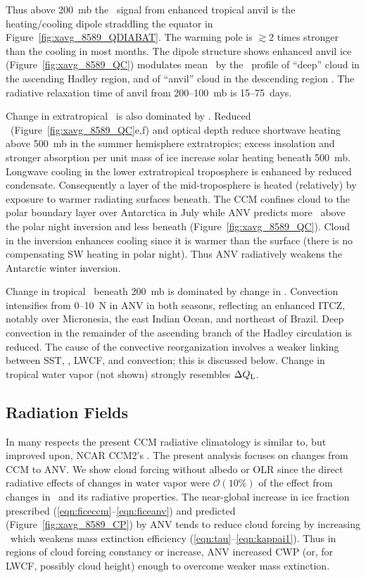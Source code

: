 \documentclass[agums]{aguplus}
\begin{document}
Thus above 200~mb the \QR\ signal from enhanced tropical anvil is the
heating/cooling dipole straddling the equator in
Figure~\ref{fig:xavg_8589_QDIABAT}. 
The warming pole is $\gtrsim 2$ times stronger than the cooling in
most months.
The dipole structure shows enhanced anvil ice
(Figure~\ref{fig:xavg_8589_QC}) modulates mean \QR\ by the \QR\
profile of ``deep'' cloud in the ascending Hadley region, and of
``anvil'' cloud in the descending region \cite[terminology of][their
Figure~16]{RaR891}. 
The radiative relaxation time of anvil from 200--100~mb is
15--75~days.  

Change in extratropical \QT\ is also dominated by \QR.
Reduced \qc\ (Figure~\ref{fig:xavg_8589_QC}e,f) and optical depth
reduce shortwave heating above 500~mb in the summer hemisphere
extratropics; excess insolation and stronger absorption per unit mass
of ice increase solar heating beneath 500~mb. 
Longwave cooling in the lower extratropical troposphere is enhanced by
reduced condensate.
Consequently a layer of the mid-troposphere is heated (relatively) by
exposure to warmer radiating surfaces beneath.
The CCM confines cloud to the polar boundary layer over Antarctica in 
July while ANV predicts more \qc\ above the polar night inversion and
less beneath (Figure~\ref{fig:xavg_8589_QC}). 
Cloud in the inversion enhances cooling since it is warmer than the
surface (there is no compensating SW heating in polar night). 
Thus ANV radiatively weakens the Antarctic winter inversion.

Change in tropical \QT\ beneath 200~mb is dominated by change in \QL.
Convection intensifies from 0--10~\dgr N in ANV in both seasons,
reflecting an enhanced ITCZ, notably over Micronesia, the east
Indian Ocean, and northeast of Brazil. 
Deep convection in the remainder of the ascending branch of the Hadley
circulation is reduced. 
The cause of the convective reorganization involves a weaker linking
between SST, \qc, LWCF, and convection; this is discussed below.
Change in tropical water vapor (not shown) strongly resembles $\Delta
\mbox{$Q_\mathrm{L}$}$. 

\subsection{Radiation Fields}\label{sec:rad}

In many respects the present CCM radiative climatology is similar to,
but improved upon, NCAR CCM2's \cite[]{KHB94}. 
The present analysis focuses on changes from CCM to ANV.
We show cloud forcing without albedo or OLR since the direct radiative
effects of changes in water vapor were $\mathcal{O}(10\%)$ of the 
effect from changes in \qc\ and its radiative properties.  
The near-global increase in ice fraction prescribed
(\ref{eqn:ficeccm}--\ref{eqn:ficeanv}) and predicted
(Figure~\ref{fig:xavg_8589_CP}) by ANV tends to reduce cloud forcing 
by increasing \rdsffc\ which weakens mass extinction efficiency
(\ref{eqn:tau}--\ref{eqn:kappai1}). 
Thus in regions of cloud forcing constancy or increase, ANV increased
CWP (or, for LWCF, possibly cloud height) enough to overcome weaker
mass extinction.
\end{document}
